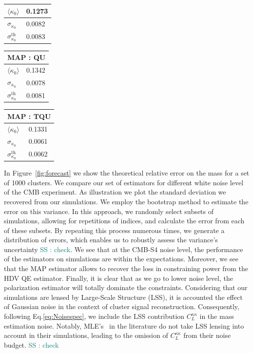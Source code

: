 \documentclass[prd, superscriptaddress, tightenlines, longbibliography, nofootinbib, eqsecnum, amsfonts, amsmath, floatfix, twocolumn, notitlepage]{revtex4-2}
\newcommand{\bb}[1]{\textcolor{teal}{SS : #1}}
\begin{document}
\begin{table}[]
\begin{tabularx}{0.15\textwidth}{|X|X|}
    $\langle\kappa_0 \rangle$      & 0.1273   \\ \hline
    $\sigma_{\kappa_0}$ & 0.0082  \\\hline
    $\sigma_{\kappa_0}^{\text{th}}$ & 0.0083  \\\hline
    \end{tabularx}
    \begin{tabularx}{0.15\textwidth}{|X|X|}
    \hline
    \multicolumn{2}{|c|}{MAP : QU} \\ \hline
    $\langle\kappa_0 \rangle$      & 0.1342   \\ \hline
    $\sigma_{\kappa_0}$ & 0.0078  \\\hline
    $\sigma_{\kappa_0}^{\text{th}}$ & 0.0081  \\\hline
    \end{tabularx}
    \begin{tabularx}{0.15\textwidth}{|X|X|}
    \hline
    \multicolumn{2}{|c|}{MAP : TQU} \\ \hline
    $\langle\kappa_0 \rangle$      & 0.1331   \\ \hline
    $\sigma_{\kappa_0}$ & 0.0061  \\\hline
    $\sigma_{\kappa_0}^{\text{th}}$ & 0.0062  \\\hline
    \end{tabularx}
    \label{tab:results}
\end{table}
In Figure~\ref{fig:forecast} we show the theoretical relative error on the mass for a set of 1000 clusters. We compare our set of estimators for different white noise level of the CMB experiment. As illustration we plot the standard deviation we recovered from our simulations. We employ the bootstrap method to estimate the error on this variance. In this approach, we randomly select subsets of simulations, allowing for repetitions of indices, and calculate the error from each of these subsets. By repeating this process numerous times, we generate a distribution of errors, which enables us to robustly assess the variance's uncertainty \bb{check}. We see that at the CMB-S4 noise level, the performance of the estimators on simulations are within the expectations. Moreover, we see that the MAP estimator allows to recover the loss in constraining power from the HDV QE estimator. Finally, it is clear that as we go to lower noise level, the polarization estimator will totally dominate the constraints. Considering that our simulations are lensed by Large-Scale Structure (LSS), it is accounted the effect of Gaussian noise in the context of cluster signal reconstruction. Consequently, following Eq.\ref{eq:Noisespec}, we include the LSS contribution $C_{L}^{\kappa \kappa}$ in the mass estimation noise. Notably, MLE's~\cite{Raghunathan:2017cle} in the literature do not take LSS lensing into account in their simulations, leading to the omission of $C_{L}^{\kappa \kappa}$ from their noise budget. \bb{check}
\end{document}
